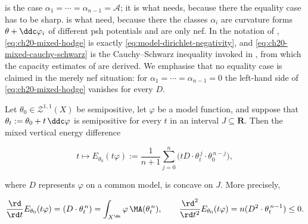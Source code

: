 \begin{remark}
\label{rem:ch20-hodge-uses}
 is the case
\(\alpha_1=\cdots=\alpha_{n-1}=\mathcal A\); it is what
 needs, because there the equality case has to be
sharp.   is what
 need, because there the
classes \(\alpha_i\) are curvature forms \(\theta+\ddc\varphi_i\) of
different psh potentials and are only nef.  In the notation of
, \eqref{eq:ch20-mixed-hodge} is
exactly \eqref{eq:model-dirichlet-negativity}, and
\eqref{eq:ch20-mixed-cauchy-schwarz} is the Cauchy--Schwarz inequality
invoked in , from which the capacity
estimates of  are derived.  We emphasise that no
equality case is claimed in the merely nef situation: for
\(\alpha_1=\cdots=\alpha_{n-1}=0\) the left-hand side of
\eqref{eq:ch20-mixed-hodge} vanishes for every \(D\).
\end{remark}

\begin{corollary}
\label{cor:ch20-concavity}
Let \(\theta_0\in\mathcal Z^{1,1}(X)\) be semipositive, let \(\varphi\) be a
model function, and suppose that \(\theta_t:=\theta_0+t\,\ddc\varphi\) is
semipositive for every \(t\) in an interval \(J\subseteq\mathbf R\).  Then
the mixed vertical energy difference

\begin{equation}
\label{eq:ch20-concavity}
 t\longmapsto E_{\theta_0}(t\varphi)
 :=\frac1{n+1}\sum_{j=0}^n
   \bigl(tD\cdot\theta_t^{\,j}\cdot\theta_0^{\,n-j}\bigr),
\end{equation}

where \(D\) represents \(\varphi\) on a common model, is concave on \(J\).
More precisely,

\[
 \frac{\rd}{\rd t}E_{\theta_0}(t\varphi)
   =(D\cdot\theta_t^{\,n})
   =\int_{X^{\An}}\varphi\,\MA(\theta_t^{\,n}),
 \qquad
 \frac{\rd^2}{\rd t^2}E_{\theta_0}(t\varphi)
   =n(D^2\cdot\theta_t^{\,n-1})\leq0.
\]
\end{corollary}


